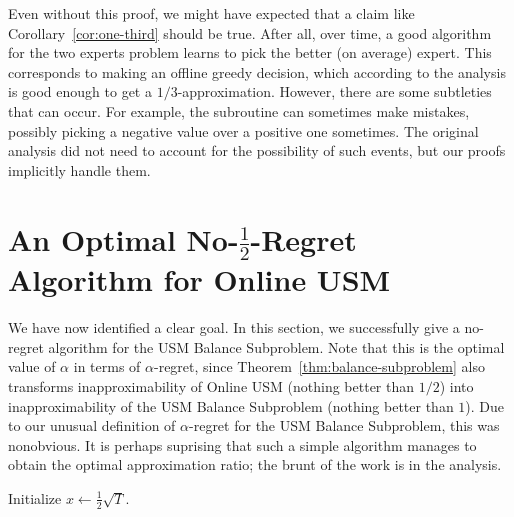 \documentclass[final,12pt]{colt2018}
\newcommand{\BalanceSubproblem}{USM Balance Subproblem}
\newcommand{\OnlineUSM}{Online USM}
\begin{document}
Even without this proof, we might have expected that a claim like
Corollary~\ref{cor:one-third} should be true. After all, over time, a
good algorithm for the two experts problem learns to pick the better
(on average) expert. This corresponds to making an offline greedy
decision, which according to the \cite{BFNS15} analysis is good enough
to get a $1/3$-approximation. However, there are some subtleties that
can occur. For example, the subroutine can sometimes make mistakes,
possibly picking a negative value over a positive one sometimes. The
original \cite{BFNS15} analysis did not need to account for the
possibility of such events, but our proofs implicitly handle them.

\section{An Optimal No-$\frac12$-Regret Algorithm for  \OnlineUSM{}}\label{s:half}
\newcommand{\OptSubroutine}{\textsc{USM Balancer}}

We have now identified a clear goal. In this section, we successfully give a no-regret algorithm for the \BalanceSubproblem{}. Note that this is the optimal value of $\alpha$ in terms of $\alpha$-regret, since Theorem~\ref{thm:balance-subproblem} also transforms inapproximability of \OnlineUSM{} (nothing better than $1/2$) into inapproximability of the \BalanceSubproblem{} (nothing better than $1$). Due to our unusual definition of $\alpha$-regret for the \BalanceSubproblem{}, this was nonobvious. It is perhaps suprising that such a simple algorithm manages to obtain the optimal approximation ratio; the brunt of the work is in the analysis.

\begin{algorithm}
\caption{\OptSubroutine{}}
\label{alg:balancer}

\vspace{.5\baselineskip}

  Initialize $x \leftarrow \frac{1}{2} \sqrt{T}$. \\
\end{algorithm}
\end{document}
